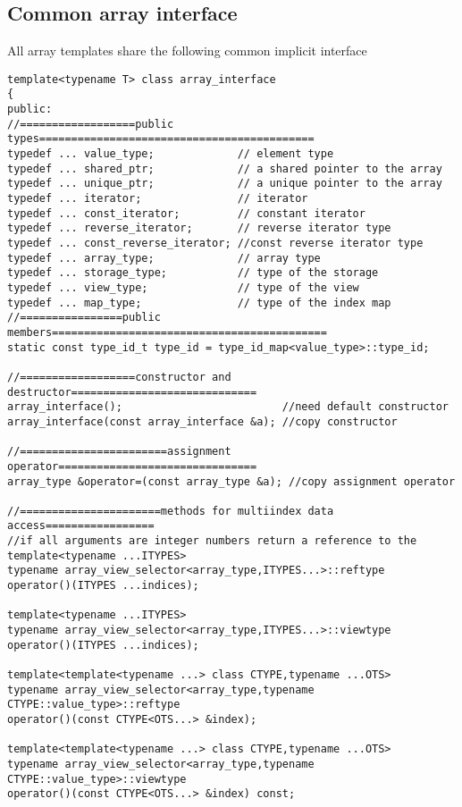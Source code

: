

\subsection{Common array interface}

All array templates share the following common implicit interface
\begin{verbatim}
template<typename T> class array_interface
{
public:
//==================public types===========================================
typedef ... value_type;             // element type
typedef ... shared_ptr;             // a shared pointer to the array
typedef ... unique_ptr;             // a unique pointer to the array
typedef ... iterator;               // iterator
typedef ... const_iterator;         // constant iterator
typedef ... reverse_iterator;       // reverse iterator type
typedef ... const_reverse_iterator; //const reverse iterator type
typedef ... array_type;             // array type
typedef ... storage_type;           // type of the storage
typedef ... view_type;              // type of the view
typedef ... map_type;               // type of the index map
//================public members===========================================
static const type_id_t type_id = type_id_map<value_type>::type_id;

//==================constructor and destructor=============================
array_interface();                         //need default constructor
array_interface(const array_interface &a); //copy constructor

//=======================assignment operator===============================
array_type &operator=(const array_type &a); //copy assignment operator

//======================methods for multiindex data access=================
//if all arguments are integer numbers return a reference to the
template<typename ...ITYPES> 
typename array_view_selector<array_type,ITYPES...>::reftype 
operator()(ITYPES ...indices);

template<typename ...ITYPES> 
typename array_view_selector<array_type,ITYPES...>::viewtype 
operator()(ITYPES ...indices);

template<template<typename ...> class CTYPE,typename ...OTS> 
typename array_view_selector<array_type,typename CTYPE::value_type>::reftype
operator()(const CTYPE<OTS...> &index);

template<template<typename ...> class CTYPE,typename ...OTS> 
typename array_view_selector<array_type,typename CTYPE::value_type>::viewtype
operator()(const CTYPE<OTS...> &index) const;


\end{verbatim}
